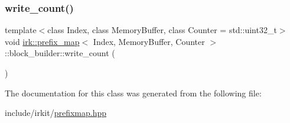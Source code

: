 \mbox{\label{classirk_1_1prefix__map_1_1block__builder_acd19257e8bac2d4af07431383c1c2c16}} 
\subsubsection{\texorpdfstring{write\+\_\+count()}{write\_count()}}
{\footnotesize\ttfamily template$<$class Index, class Memory\+Buffer, class Counter = std\+::uint32\+\_\+t$>$ \\
void \mbox{\hyperlink{classirk_1_1prefix__map}{irk\+::prefix\+\_\+map}}$<$ Index, Memory\+Buffer, Counter $>$\+::block\+\_\+builder\+::write\+\_\+count (\begin{DoxyParamCaption}{ }\end{DoxyParamCaption})\hspace{0.3cm}{\ttfamily [inline]}}



The documentation for this class was generated from the following file\+:\begin{DoxyCompactItemize}
\item 
include/irkit/\mbox{\hyperlink{prefixmap_8hpp}{prefixmap.\+hpp}}\end{DoxyCompactItemize}
